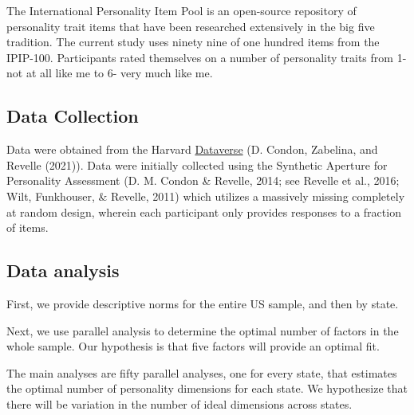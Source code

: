 \documentclass[
  english,
  man]{apa6}
\begin{document}
The International Personality Item Pool is an open-source repository of personality trait items that have been researched extensively in the big five tradition. The current study uses ninety nine of one hundred items from the IPIP-100. Participants rated themselves on a number of personality traits from 1- not at all like me to 6- very much like me.

\hypertarget{data-collection}{%
\subsection{Data Collection}\label{data-collection}}

Data were obtained from the Harvard \href{https://dataverse.harvard.edu/dataverse/SAPA-Project}{Dataverse} (D. Condon, Zabelina, and Revelle (2021)). Data were initially collected using the Synthetic Aperture for Personality Assessment (D. M. Condon \& Revelle, 2014; see Revelle et al., 2016; Wilt, Funkhouser, \& Revelle, 2011) which utilizes a massively missing completely at random design, wherein each participant only provides responses to a fraction of items.

\hypertarget{data-analysis}{%
\subsection{Data analysis}\label{data-analysis}}

First, we provide descriptive norms for the entire US sample, and then by state.

Next, we use parallel analysis to determine the optimal number of factors in the whole sample. Our hypothesis is that five factors will provide an optimal fit.

The main analyses are fifty parallel analyses, one for every state, that estimates the optimal number of personality dimensions for each state. We hypothesize that there will be variation in the number of ideal dimensions across states.
\end{document}
